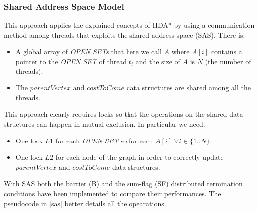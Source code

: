 \documentclass[twocolumn, switch]{article} %
\begin{document}
\subsubsection{Shared Address Space Model}
This approach applies the explained concepts of HDA* by using a communication method
among threads that exploits the shared address space (SAS). There is:
\begin{itemize}
  \item A global array of \textit{OPEN SETs} that here we call $A$ where
        $A[i]$ contains a pointer to the \textit{OPEN SET} of thread $t_i$ and the size
        of $A$ is $N$ (the number of threads).
  \item The $parentVertex$ and $costToCome$ data structures are shared among all the threads.
\end{itemize}
This approach clearly requires locks so that the operations on the shared data structures
can happen in mutual exclusion. In particular we need:
\begin{itemize}
  \item One lock $L1$ for each \textit{OPEN SET} so for each $A[i] \;\forall i \in \{1..N\}$.
  \item One lock $L2$ for each node of the graph in order to correctly update $parentVertex$ and $costToCome$ data structures.
\end{itemize}
With SAS both the barrier (B) and the sum-flag (SF) distributed termination conditions
have been implemented to compare their performances.
The pseudocode in \ref{sas} better details all the opearations.
\end{document}
